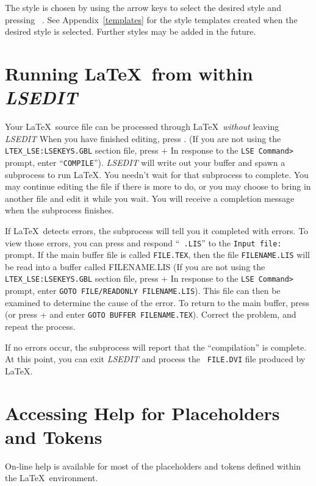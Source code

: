 The style is chosen by using the arrow keys to select the desired style and
pressing \mbox{ \return.} See Appendix~\ref{templates} for the style templates 
created when the desired style is selected. Further styles may be added in the
future.
 
\section{Running \LaTeX\ from within {\sl LSEDIT\/}}

Your \LaTeX\ source file can be processed through \LaTeX\ {\em without\/}
leaving {\sl LSEDIT\/} When you have finished editing, press . (If
you are not using the {\tt LTEX\_LSE:LSEKEYS.GBL} section  file, press \gold +
 In response to the \verb"LSE Command>" prompt, enter ``{\tt COMPILE}'').
{\sl LSEDIT\/} will write out your buffer and spawn a subprocess to run \LaTeX.
You needn't wait for that subprocess to complete. You may continue editing the
file if there is more to do, or you may choose to bring in another file and
edit it while you wait. You will receive a completion message when the
subprocess finishes. 


If \LaTeX\ detects errors, the subprocess will tell you it completed with
errors. To view those errors, you can press   and respond ``{\tt
.LIS}'' to the {\tt \us Input file:} prompt. If the main buffer file is called
{\tt FILE.TEX}, then the file {\tt FILENAME.LIS} will be read into a buffer
called FILENAME.LIS (If you are not using the {\tt LTEX\_LSE:LSEKEYS.GBL}
section file, press \gold +  In response to the  \verb"LSE Command>"
prompt, enter {\tt GOTO FILE/READONLY FILENAME.LIS}).   This file can then be
examined to determine the cause of the error. To return to the main buffer,
press   (or press \gold +  and enter {\tt GOTO BUFFER
FILENAME.TEX}). Correct the problem, and repeat the process. 

If no errors occur, the subprocess will report that the ``compilation'' is
complete. At this point, you can exit {\sl LSEDIT\/} and process the {\tt
FILE.DVI} file produced by \LaTeX.

\section{Accessing Help for Placeholders and Tokens}

On-line help is available for most of the placeholders and tokens defined
within the \LaTeX\ environment. 

